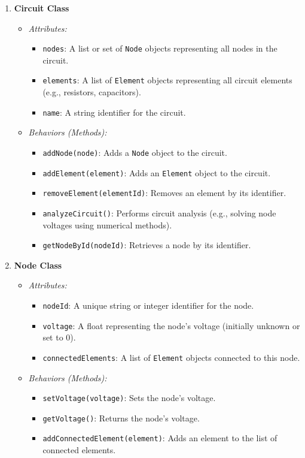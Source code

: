 \documentclass{article}
\begin{document}
\begin{enumerate}
    \item \textbf{Circuit Class}
    \begin{itemize}
        \item \textit{Attributes:}
        \begin{itemize}
            \item \texttt{nodes}: A list or set of \texttt{Node} objects representing all nodes in the circuit.
            \item \texttt{elements}: A list of \texttt{Element} objects representing all circuit elements (e.g., resistors, capacitors).
            \item \texttt{name}: A string identifier for the circuit.
        \end{itemize}
        \item \textit{Behaviors (Methods):}
        \begin{itemize}
            \item \texttt{addNode(node)}: Adds a \texttt{Node} object to the circuit.
            \item \texttt{addElement(element)}: Adds an \texttt{Element} object to the circuit.
            \item \texttt{removeElement(elementId)}: Removes an element by its identifier.
            \item \texttt{analyzeCircuit()}: Performs circuit analysis (e.g., solving node voltages using numerical methods).
            \item \texttt{getNodeById(nodeId)}: Retrieves a node by its identifier.
        \end{itemize}
    \end{itemize}

    \item \textbf{Node Class}
    \begin{itemize}
        \item \textit{Attributes:}
        \begin{itemize}
            \item \texttt{nodeId}: A unique string or integer identifier for the node.
            \item \texttt{voltage}: A float representing the node’s voltage (initially unknown or set to 0).
            \item \texttt{connectedElements}: A list of \texttt{Element} objects connected to this node.
        \end{itemize}
        \item \textit{Behaviors (Methods):}
        \begin{itemize}
            \item \texttt{setVoltage(voltage)}: Sets the node’s voltage.
            \item \texttt{getVoltage()}: Returns the node’s voltage.
            \item \texttt{addConnectedElement(element)}: Adds an element to the list of connected elements.
        \end{itemize}
    \end{itemize}


\end{enumerate}
\end{document}
